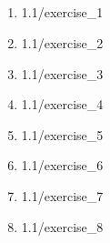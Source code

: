 \documentclass {article}
\renewcommand{\thesubsection}{}
\begin{document}
	\setcounter{section}{1}
	\renewcommand{\thesubsection}{Section \arabic{section}.\arabic{subsection}}
	\subsection{}
	\begin{enumerate}
		\item  {1.1/exercise_1}
		\item  {1.1/exercise_2}
		\item  {1.1/exercise_3}
		\item  {1.1/exercise_4}
		\item  {1.1/exercise_5}
		\item  {1.1/exercise_6}
		\item  {1.1/exercise_7}
		\item  {1.1/exercise_8}
	\end{enumerate}
	\renewcommand{\thesubsection}{}
\end{document}
